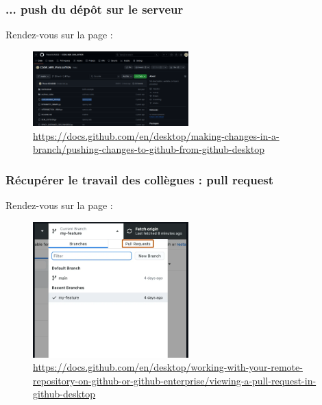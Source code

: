 \begin{frame}
  \frametitle{... push du dépôt sur le serveur}

Rendez-vous sur la page : 
\begin{figure}
\caption{\url{https://docs.github.com/en/desktop/making-changes-in-a-branch/pushing-changes-to-github-from-github-desktop}}
  \includegraphics[width=6cm]{images/github_push_compte.png}
  \end{figure}
  
\end{frame}

\begin{frame}
  \frametitle{Récupérer le travail des collègues : pull request}

Rendez-vous sur la page : 
\begin{figure}
\caption{\url{https://docs.github.com/en/desktop/working-with-your-remote-repository-on-github-or-github-enterprise/viewing-a-pull-request-in-github-desktop}}
  \includegraphics[width=6cm]{images/pull_request.png}
  \end{figure}
  
\end{frame}


